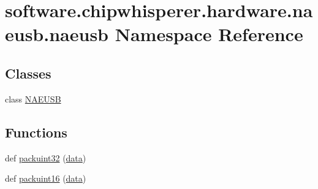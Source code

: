 \hypertarget{namespacesoftware_1_1chipwhisperer_1_1hardware_1_1naeusb_1_1naeusb}{}\section{software.\+chipwhisperer.\+hardware.\+naeusb.\+naeusb Namespace Reference}
\label{namespacesoftware_1_1chipwhisperer_1_1hardware_1_1naeusb_1_1naeusb}
\subsection*{Classes}
\begin{DoxyCompactItemize}
\item 
class \hyperlink{classsoftware_1_1chipwhisperer_1_1hardware_1_1naeusb_1_1naeusb_1_1NAEUSB}{N\+A\+E\+U\+S\+B}
\end{DoxyCompactItemize}
\subsection*{Functions}
\begin{DoxyCompactItemize}
\item 
def \hyperlink{namespacesoftware_1_1chipwhisperer_1_1hardware_1_1naeusb_1_1naeusb_a51ac98c158e5ef60f6b600a4761ed279}{packuint32} (\hyperlink{namespacesoftware_1_1chipwhisperer_1_1hardware_1_1naeusb_1_1naeusb_a490446b9215f63f77a4abed9b8009220}{data})
\item 
def \hyperlink{namespacesoftware_1_1chipwhisperer_1_1hardware_1_1naeusb_1_1naeusb_ac69408c7101a5e39a44008f4dced71d0}{packuint16} (\hyperlink{namespacesoftware_1_1chipwhisperer_1_1hardware_1_1naeusb_1_1naeusb_a490446b9215f63f77a4abed9b8009220}{data})
\end{DoxyCompactItemize}
